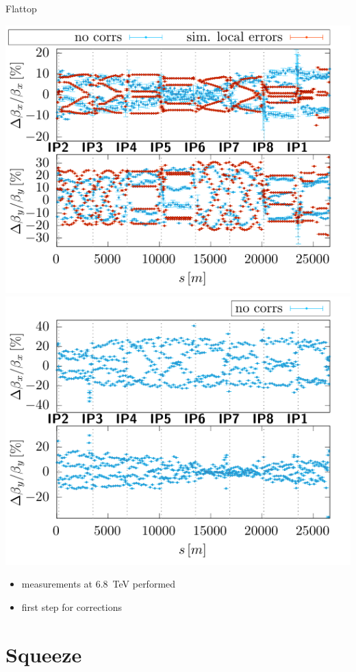 \documentclass[11pt,usenames,dvipsnames,aspectratio=169]{beamer}
\begin{document}
\begin{frame}{Flattop}
    
    \includegraphics[width=0.49\linewidth]{images/flattop/b1_bb.pdf}
    \hfill
    \includegraphics[width=0.49\linewidth]{images/flattop/b2_bb.pdf}
    \begin{itemize}
        \item measurements at \SI{6.8}{TeV} performed
        \item first step for corrections
    \end{itemize}
    
\end{frame}

\section{Squeeze}

\begin{frame}{\SI{30{cm} Optics -- record high \beta~beating}

\texttt{[image: im]}
    
\end{frame}
\end{document}
